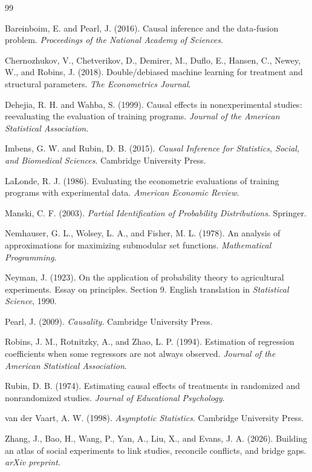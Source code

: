 \documentclass[11pt]{article}
\numberwithin{equation}{section}
\newcommand{\1}{\mathbf 1}
\begin{document}
\begin{thebibliography}{99}

Bareinboim, E. and Pearl, J. (2016).
Causal inference and the data-fusion problem.
\emph{Proceedings of the National Academy of Sciences}.

Chernozhukov, V., Chetverikov, D., Demirer, M., Duflo, E., Hansen, C., Newey, W., and Robins, J. (2018).
Double/debiased machine learning for treatment and structural parameters.
\emph{The Econometrics Journal}.

Dehejia, R. H. and Wahba, S. (1999).
Causal effects in nonexperimental studies: reevaluating the evaluation of training programs.
\emph{Journal of the American Statistical Association}.

Imbens, G. W. and Rubin, D. B. (2015).
\emph{Causal Inference for Statistics, Social, and Biomedical Sciences}.
Cambridge University Press.

LaLonde, R. J. (1986).
Evaluating the econometric evaluations of training programs with experimental data.
\emph{American Economic Review}.

Manski, C. F. (2003).
\emph{Partial Identification of Probability Distributions}.
Springer.

Nemhauser, G. L., Wolsey, L. A., and Fisher, M. L. (1978).
An analysis of approximations for maximizing submodular set functions.
\emph{Mathematical Programming}.

Neyman, J. (1923).
On the application of probability theory to agricultural experiments. Essay on principles. Section 9.
English translation in \emph{Statistical Science}, 1990.

Pearl, J. (2009).
\emph{Causality}.
Cambridge University Press.

Robins, J. M., Rotnitzky, A., and Zhao, L. P. (1994).
Estimation of regression coefficients when some regressors are not always observed.
\emph{Journal of the American Statistical Association}.

Rubin, D. B. (1974).
Estimating causal effects of treatments in randomized and nonrandomized studies.
\emph{Journal of Educational Psychology}.

van der Vaart, A. W. (1998).
\emph{Asymptotic Statistics}.
Cambridge University Press.

Zhang, J., Bao, H., Wang, P., Yan, A., Liu, X., and Evans, J. A. (2026).
Building an atlas of social experiments to link studies, reconcile conflicts, and bridge gaps.
\emph{arXiv preprint}.

\end{thebibliography}
\end{document}
